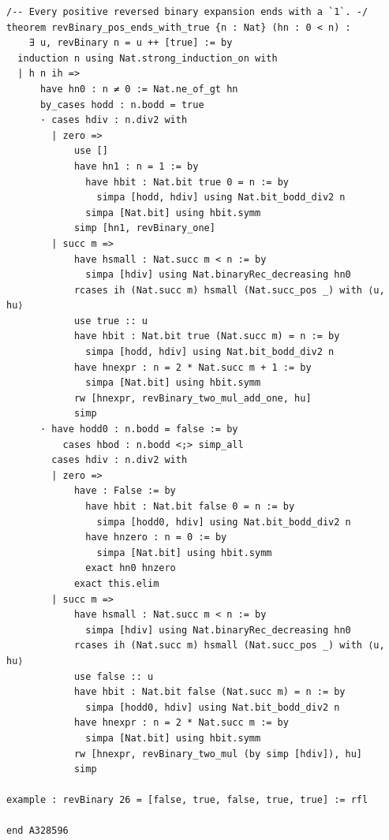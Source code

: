 \documentclass[11pt]{article}
\theoremstyle{definition}
\theoremstyle{remark}
\begin{document}
\begin{lstlisting}
/-- Every positive reversed binary expansion ends with a `1`. -/
theorem revBinary_pos_ends_with_true {n : Nat} (hn : 0 < n) :
    ∃ u, revBinary n = u ++ [true] := by
  induction n using Nat.strong_induction_on with
  | h n ih =>
      have hn0 : n ≠ 0 := Nat.ne_of_gt hn
      by_cases hodd : n.bodd = true
      · cases hdiv : n.div2 with
        | zero =>
            use []
            have hn1 : n = 1 := by
              have hbit : Nat.bit true 0 = n := by
                simpa [hodd, hdiv] using Nat.bit_bodd_div2 n
              simpa [Nat.bit] using hbit.symm
            simp [hn1, revBinary_one]
        | succ m =>
            have hsmall : Nat.succ m < n := by
              simpa [hdiv] using Nat.binaryRec_decreasing hn0
            rcases ih (Nat.succ m) hsmall (Nat.succ_pos _) with ⟨u, hu⟩
            use true :: u
            have hbit : Nat.bit true (Nat.succ m) = n := by
              simpa [hodd, hdiv] using Nat.bit_bodd_div2 n
            have hnexpr : n = 2 * Nat.succ m + 1 := by
              simpa [Nat.bit] using hbit.symm
            rw [hnexpr, revBinary_two_mul_add_one, hu]
            simp
      · have hodd0 : n.bodd = false := by
          cases hbod : n.bodd <;> simp_all
        cases hdiv : n.div2 with
        | zero =>
            have : False := by
              have hbit : Nat.bit false 0 = n := by
                simpa [hodd0, hdiv] using Nat.bit_bodd_div2 n
              have hnzero : n = 0 := by
                simpa [Nat.bit] using hbit.symm
              exact hn0 hnzero
            exact this.elim
        | succ m =>
            have hsmall : Nat.succ m < n := by
              simpa [hdiv] using Nat.binaryRec_decreasing hn0
            rcases ih (Nat.succ m) hsmall (Nat.succ_pos _) with ⟨u, hu⟩
            use false :: u
            have hbit : Nat.bit false (Nat.succ m) = n := by
              simpa [hodd0, hdiv] using Nat.bit_bodd_div2 n
            have hnexpr : n = 2 * Nat.succ m := by
              simpa [Nat.bit] using hbit.symm
            rw [hnexpr, revBinary_two_mul (by simp [hdiv]), hu]
            simp

example : revBinary 26 = [false, true, false, true, true] := rfl

end A328596
\end{lstlisting}
\end{document}
